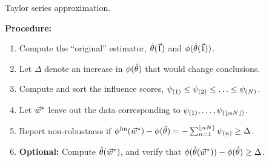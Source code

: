 

\begin{frame}{Taylor series approximation.}

\textbf{Procedure:}

\begin{enumerate}
    \item<2-> Compute the ``original'' estimator, $\hat{\theta}(\vec{1})$ and
    $\phi(\hat{\theta}(\vec{1}))$.
    \item<3-> Let $\Delta$ denote an increase in $\phi(\hat{\theta})$
    that would change conclusions.
    \item<4-> Compute and sort the influence scores,
        $\psi_{(1)} \le \psi_{(2)} \le \ldots \le \psi_{(N)}$.
    \item<5-> Let $\vec{w}^*$ leave out the data corresponding to
    $\psi_{(1)},  \ldots , \psi_{(\lfloor \alpha N \rfloor)}$.
    \item<6-> Report non-robustness if
        $ \phi^{\mathrm{lin}}(\vec{w}^*) - \phi(\hat{\theta})  =
            - \sum_{n=1}^{\lfloor \alpha N \rfloor} \psi_{(n)} \ge \Delta$.
    \item<7-> \textbf{Optional: } Compute $\hat{\theta}(\vec{w}^*)$, and verify
    that $\phi(\hat{\theta}(\vec{w}^*)) - \phi(\hat{\theta}) \ge \Delta$.
\end{enumerate}

\end{frame}
